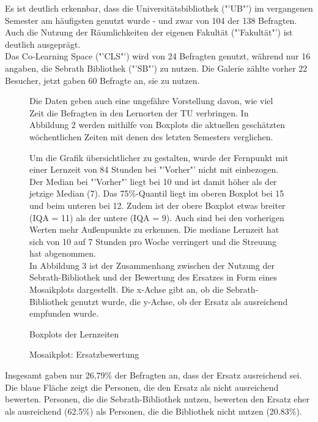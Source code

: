 \documentclass[11pt, a4paper]{article}
\begin{document}
Es ist deutlich erkennbar, dass die Universitätsbibliothek ("'UB"') im vergangenen Semester am häufigsten genutzt wurde - und zwar von 104 der 138 Befragten. Auch die Nutzung der Räumlichkeiten der eigenen Fakultät ("'Fakultät"') ist deutlich ausgeprägt.\\ Das Co-Learning Space ("'CLS"') wird von 24  Befragten genutzt, während nur 16 angaben, die Sebrath Bibliothek ("'SB"') zu nutzen. 
Die Galerie zählte vorher 22 Besucher, jetzt gaben 60 Befragte an, sie zu nutzen.
\begin{figure}[htp]
	Die Daten geben auch eine ungefähre Vorstellung davon, wie viel Zeit die Befragten in den Lernorten der TU verbringen.
	In Abbildung 2 werden mithilfe von Boxplots die aktuellen geschätzten wöchentlichen Zeiten mit denen des letzten Semesters verglichen. \\
	\vspace{-1.5cm}
	\hspace{-0.8cm}
	{\centering} 
	\vspace{0cm}
	\caption{Boxplots der Lernzeiten}
	\vspace{0.7cm}
	Um die Grafik übersichtlicher zu gestalten, wurde der Fernpunkt mit einer Lernzeit von 84 Stunden bei "'Vorher"' nicht mit einbezogen.
	Der Median bei "'Vorher"' liegt bei 10 und ist damit höher als der jetzige Median (7).
	Das 75\%-Quantil liegt im oberen Boxplot bei 15 und beim unteren bei 12.
	Zudem ist der obere Boxplot etwas breiter (IQA = 11) als der untere (IQA = 9).
	Auch sind bei den vorherigen Werten mehr Außenpunkte zu erkennen.
	Die mediane Lernzeit hat sich von 10 auf 7 Stunden pro Woche verringert und die Streuung hat abgenommen.\\
	In Abbildung 3 ist der Zusammenhang zwischen der Nutzung der Sebrath-Bibliothek  und der Bewertung des Ersatzes in Form eines Mosaikplots dargestellt. Die x-Achse gibt an, ob die Sebrath-Bibliothek genutzt wurde, die y-Achse, ob der Ersatz als ausreichend empfunden wurde. 
	\end{figure}
		\vspace{-5cm}
	\begin{figure}[h]
	 \begin{center}
	{\centering } \end{center}
	\vspace{-1.5cm}
	\caption{Mosaikplot: Ersatzbewertung}
\end{figure}


\newpage
Insgesamt gaben nur 26,79\% der Befragten an, dass der Ersatz ausreichend sei. Die blaue Fläche zeigt die Personen, die den Ersatz als nicht ausreichend bewerten. Personen, die die Sebrath-Bibliothek nutzen, bewerten den Ersatz eher als ausreichend (62.5\%) als Personen, die die Bibliothek nicht nutzen (20.83\%).
\end{document}
